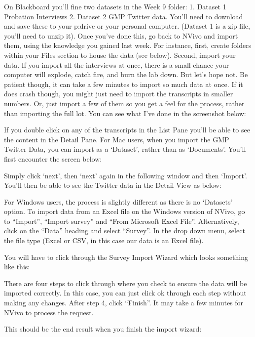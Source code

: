 \documentclass[
]{book}
\begin{document}
On Blackboard you'll fine two datasets in the Week 9 folder: 1. Dataset 1 Probation Interviews 2. Dataset 2 GMP Twitter data.
You'll need to download and save these to your p:drive or your personal computer. (Dataset 1 is a zip file, you'll need to unzip it). Once you've done this, go back to NVivo and import them, using the knowledge you gained last week. For instance, first, create folders within your Files section to house the data (see below). Second, import your data. If you import all the interviews at once, there is a small chance your computer will explode, catch fire, and burn the lab down. But let's hope not. Be patient though, it can take a few minutes to import so much data at once. If it does crash though, you might just need to import the transcripts in smaller numbers. Or, just import a few of them so you get a feel for the process, rather than importing the full lot. You can see what I've done in the screenshot below:

If you double click on any of the transcripts in the List Pane you'll be able to see the content in the Detail Pane.
For Mac users, when you import the GMP Twitter Data, you can import as a `Dataset', rather than as `Documents'. You'll first encounter the screen below:

Simply click `next', then `next' again in the following window and then `Import'. You'll then be able to see the Twitter data in the Detail View as below:

For Windows users, the process is slightly different as there is no `Datasets' option. To import data from an Excel file on the Windows version of NVivo, go to ``Import'', ``Import survey'' and ``From Microsoft Excel File''. Alternatively, click on the ``Data'' heading and select ``Survey''. In the drop down menu, select the file type (Excel or CSV, in this case our data is an Excel file).

You will have to click through the Survey Import Wizard which looks something like this:

There are four steps to click through where you check to ensure the data will be imported correctly. In this case, you can just click ok through each step without making any changes. After step 4, click ``Finish''. It may take a few minutes for NVivo to process the request.

This should be the end result when you finish the import wizard:
\end{document}
